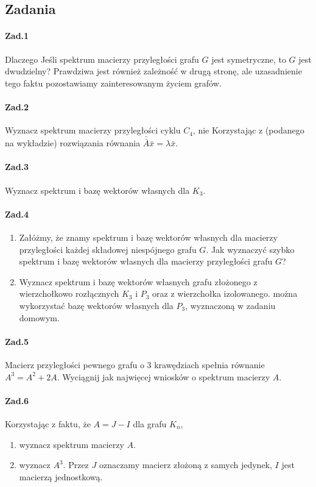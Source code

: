 \documentclass[a4paper,12pt]{article}
\theoremstyle{definition}%
\theoremstyle{definition}
\theoremstyle{problem}
\begin{document}
\subsection{Zadania}
\paragraph{Zad.1} Dlaczego Jeśli spektrum macierzy przyległości grafu $G$ jest symetryczne, to $G$ jest dwudzielny? Prawdziwa jest również zależność w drugą stronę, ale uzasadnienie tego faktu pozostawiamy zainteresowanym życiem grafów.
\paragraph{Zad.2} Wyznacz spektrum macierzy przyległości cyklu $C_4$, nie Korzystając z (podanego na wykładzie) rozwiązania równania $\bar{\bar{A}}\bar{x} = \lambda \bar{x}$.
\paragraph{Zad.3} Wyznacz spektrum i bazę wektorów własnych dla $K_3$.
\paragraph{Zad.4}
\begin{enumerate}[label=\alph*)]
\item Załóżmy, że znamy spektrum i bazę wektorów własnych dla macierzy przyległości każdej składowej niespójnego grafu $G$. Jak wyznaczyć szybko spektrum i bazę wektorów własnych dla macierzy przyległości grafu $G$?
\item Wyznacz spektrum i bazę wektorów własnych grafu złożonego z wierzchołkowo rozłącznych $K_3$ i $P_3$ oraz z wierzchołka izolowanego. można wykorzystać bazę wektorów własnych dla $P_3$, wyznaczoną w zadaniu domowym.
\end{enumerate}

\paragraph{Zad.5} Macierz przyległości pewnego grafu o $3$ krawędziach spełnia równanie $A^3 = A^2 + 2A$. Wyciągnij jak najwięcej wniosków o spektrum macierzy $A$.
\paragraph{Zad.6} Korzystając z faktu, że $A = J - I$ dla grafu $K_n$,
\begin{enumerate}[label=\alph*)]
\item wyznacz spektrum macierzy $A$.
\item wyznacz $A^3$. Przez $J$ oznaczamy macierz złożoną z samych jedynek, $I$ jest macierzą jednostkową.
\end{enumerate}


\end{document}
